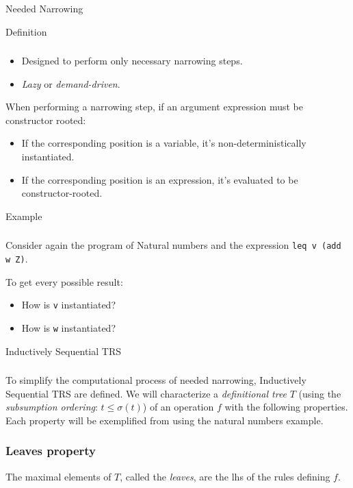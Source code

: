 \documentclass{beamer}
\begin{document}
\begin{section}{Needed Narrowing}
  \begin{subsection}{Definition}
    \begin{frame}
      \frametitle{\subsecname}
      
      \begin{itemize}
        \item Designed to perform only necessary narrowing steps.
        \item \textit{Lazy} or \textit{demand-driven}.
      \end{itemize}

      \bigskip
      When performing a narrowing step, if an argument expression must be constructor rooted:
      \begin{itemize}
        \item If the corresponding position is a variable, it's non-deterministically instantiated.
        \item If the corresponding position is an expression, it's evaluated to be constructor-rooted.
      \end{itemize}
      
    \end{frame}
  \end{subsection}
\begin{subsection}{Example}

\begin{frame}[fragile]
\frametitle{\subsecname}
Consider again the program of Natural numbers and the expression \verb|leq v (add w Z)|. 

\bigskip
To get every possible result:
\begin{itemize}
  \item How is \verb|v| instantiated?
  \item How is \verb|w| instantiated?
  
\end{itemize}

\end{frame}
\end{subsection}
\begin{subsection}{Inductively Sequential TRS}
  \begin{frame}[allowpagebreaks]
\frametitle{\subsecname}
To simplify the computational process of needed narrowing, Inductively Sequential TRS are defined. We will characterize a \textit{definitional tree} $T$ (using the \textit{subsumption ordering}: $t \leq \sigma (t)$) of an operation $f$ with the following properties. Each property will be exemplified from using the natural numbers example.
\end{frame}
\begin{frame}
[fragile]
\frametitle{Leaves property} The maximal elements of $T$, called the \textit{leaves}, are the lhs of the rules defining $f$.


\end{frame}
\end{subsection}
\end{section}
\end{document}
